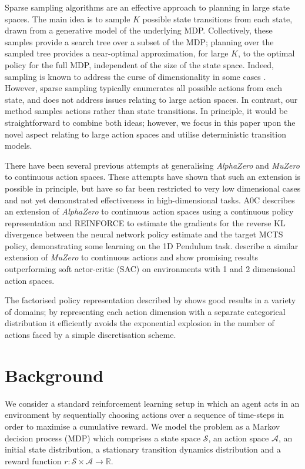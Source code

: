 \documentclass{article}
\newcommand{\alphazero}{\emph{AlphaZero}}
\newcommand{\muzero}{\emph{MuZero}}
\begin{document}
Sparse sampling algorithms \cite{kearns-mansour-ng:sparse-sampling} are an effective approach to planning in large state spaces. The main idea is to sample $K$ possible state transitions from each state, drawn from a generative model of the underlying MDP. Collectively, these samples provide a search tree over a subset of the MDP; planning over the sampled tree provides a near-optimal approximation, for large $K$, to the optimal policy for the full MDP, independent of the size of the state space. Indeed, sampling is known to address the curse of dimensionality in some cases \cite{rust1997}. However, sparse sampling typically enumerates all possible actions from each state, and does not address issues relating to large action spaces. In contrast, our method samples actions rather than state transitions. In principle, it would be straightforward to combine both ideas; however, we focus in this paper upon the novel aspect relating to large action spaces and utilise deterministic transition models.



There have been several previous attempts at generalising \alphazero{} and \muzero{} to continuous action spaces. These attempts have shown that such an extension is possible in principle, but have so far been restricted to very low dimensional cases and not yet demonstrated effectiveness in high-dimensional tasks.
A0C \cite{moerland2018a0c} describes an extension of \alphazero{} to continuous action spaces using a continuous policy representation and REINFORCE \cite{williams1992simple} to estimate the gradients for the reverse KL divergence between the neural network policy estimate and the target MCTS policy, demonstrating some learning on the 1D Pendulum task.
\cite{yang2020continuous} describe a similar extension of \muzero{} to continuous actions and show promising results outperforming soft actor-critic (SAC) \cite{haarnoja2018soft} on environments with 1 and 2 dimensional action spaces.

The factorised policy representation described by \cite{tang2020discretizing} shows good results in a variety of domains; by representing each action dimension with a separate categorical distribution it efficiently avoids the exponential explosion in the number of actions faced by a simple discretisation scheme.


\section{Background}
We consider a standard reinforcement learning setup in which an agent acts in an environment by sequentially choosing actions over a sequence of time-steps in order to maximise a cumulative reward. We model the problem as a Markov decision process (MDP) which comprises a state space $\mathcal{S}$, an action space $\mathcal{A}$, an initial state distribution, a stationary transition dynamics distribution and a reward function $r: \mathcal{S}\times\mathcal{A}\to\mathbb{R}$.
\end{document}
